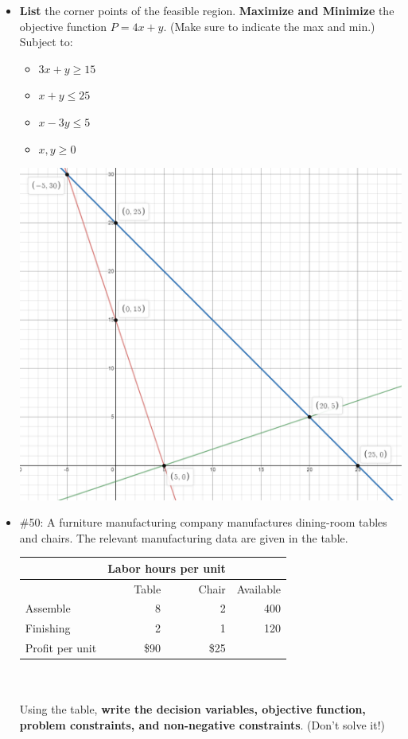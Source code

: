 \documentclass[12pt]{article}
\begin{document}
\begin{itemize}
\begin{itemize}
\cleardoublepage
		\item \textbf{List} the corner points of the feasible region. \textbf{Maximize and Minimize} the objective function $P=4x+y$. (Make sure to indicate the max and min.) Subject to:
		\begin{itemize}
			\item $3x+y\geq 15$
			\item $x+y \leq 25$
			\item $x-3y \leq 5$
			\item $x,y \geq 0$
		\end{itemize}
		\includegraphics[width=.9\linewidth]{graph}  



\item \#50: A furniture manufacturing company manufactures dining-room tables and chairs. The relevant manufacturing data are given in the table. \\
\begin{tabular}{|l|r|r|r|}
	\hline
	& \multicolumn{2}{|c|}{Labor hours per unit} & \\
	\hline
	& Table & Chair & Available \\
	\hline
	Assemble & 8 & 2 & 400 \\
	\hline
	Finishing &2 & 1 & 120 \\
	\hline
	Profit per unit & \$90 & \$25 &  \\
	\hline
\end{tabular}
\\\\ Using the  table, \textbf{write the decision variables, objective function, problem constraints, and non-negative constraints}. (Don't solve it!)



\end{itemize}
\end{itemize}
\end{document}
